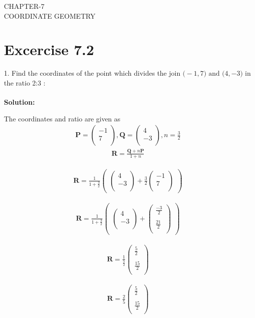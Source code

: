 \documentclass[12pt]{article}
\newcommand{\solution}{\noindent \textbf{Solution: }}
\newcommand{\myvec}[1]{\ensuremath{\begin{pmatrix}#1\end{pmatrix}}}
\let\vec\mathbf
\begin{document}
\begin{center}
\textbf\large{CHAPTER-7 \\ COORDINATE GEOMETRY}
\end{center}
\section*{Excercise 7.2}

1. Find the coordinates of the point which divides the join $\vec(-1,7) \text{ and } \vec(4,-3)$ in the ratio 2:3 :
\\
\\
\solution		

 The coordinates and ratio are given as
\begin{align}
\vec{P} = \myvec{
-1\\
7\\
},
\vec{Q} = \myvec{
4\\
-3\\
},  n=\frac{3}{2}
\end{align}
\begin{align}
\vec{R} =\frac{\vec{Q}+n\vec{P}}{1+n}
\end{align}


\begin{align}
	\vec{R}=   \frac{1}{1+\frac{3}{2}}  \myvec{\myvec{
4\\
-3\\
}
  +
   \frac{3}{2}\myvec{
-1\\
7\\
}}
\end{align}

\begin{align}
\vec{R}= \frac{1}{1+\frac{3}{2}} \myvec{\myvec{
4\\
-3\\
}
  +
  \myvec{
	  \frac{-3}{2}\\
	  \\
	\frac{21}{2}\\
}} 
\end{align}

\begin{align}
	\vec{R}=\frac{1}{\frac{5}{2}} 
	\myvec{
	\frac{5}{2}\\
	\\
	\frac{15}{2}\\
}
\end{align}

\begin{align}
          \vec{R}=\frac{2}{5}
        \myvec{
          \frac{5}{2}\\
	  \\
	\frac{15}{2}\\
  }
  \end{align}
\end{document}
